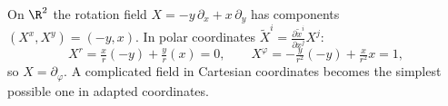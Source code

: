\begin{example}
On $\R^2$ the rotation field $X=-y\,\partial_x+x\,\partial_y$ has components $(X^x,X^y)=(-y,x)$. In polar coordinates $\tilde X^i=\frac{\partial\tilde x^i}{\partial x^j}X^j$:
\[
X^r=\tfrac{x}{r}(-y)+\tfrac{y}{r}(x)=0,\qquad X^\varphi=-\tfrac{y}{r^2}(-y)+\tfrac{x}{r^2}x=1,
\]
so $X=\partial_\varphi$. A complicated field in Cartesian coordinates becomes the simplest possible one in adapted coordinates.
\end{example}

